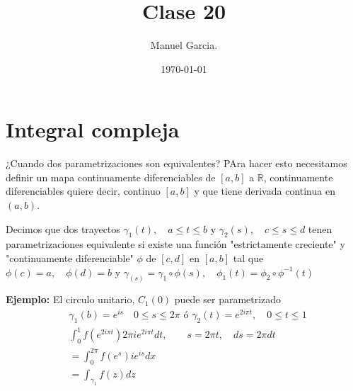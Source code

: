 \documentclass{article}
\title{Clase 20 }
\author{Manuel Garcia.}
\date{\today}
\newcommand{\caja}[3]{%
  \begin{tcolorbox}[colback=#1!5!white,colframe=#1!25!black,title=#2]
    #3
  \end{tcolorbox}%
}
\begin{document}
\maketitle

\section{Integral compleja }
¿Cuando dos parametrizaciones son equivalentes? PAra hacer esto necesitamos definir un mapa continuamente diferenciables de $ [a,b ] $ a $ \mathbb{R} $, continuamente diferenciables quiere decir, continuo $ [a,b ] $ y que tiene derivada continua en $ (a,b) $. 

\caja{green}{Definicion }{
  
  Decimos que dos trayectos $ \gamma_1(t), \quad a \leq t \leq b  $ y $ \gamma_2(s), \quad c \leq s \leq d$ tenen parametrizaciones equivalente si existe una función "estrictamente creciente" y "continuamente diferenciable" $ \phi  $ de $ [c,d]  $ en $ [a,b] $ tal que $ \phi(c) = a , \quad \phi (d) = b  $ y $ \gamma_(s) = \gamma_1  \circ \phi(s), \quad \phi_1(t) = \phi_2 \circ \phi^{-1}(t) $
}

\textbf{Ejemplo: }El circulo unitario, $ C_1(0) $ puede ser parametrizado 
\begin{align*}
  &\gamma_1(b) = e ^ {i s } \quad 0 \leq s \leq 2 \pi  \text{ ó } \gamma_2(t) = e ^ {2i\pi t }, \quad 0 \leq t \leq 1 \\
  &\displaystyle\int_{0 }^{1 } f(e ^ {2i\pi t }) 2\pi i e ^ {2i\pi t }dt, \qquad s = 2 \pi t, \quad ds = 2\pi dt \\
  &= \displaystyle\int_{0 }^{2\pi}f(e ^ {s })i e ^ {is }dx \\
  &= \displaystyle\int_{\gamma_1 }^{}f(z)dz 
\end{align*}
\end{document}
